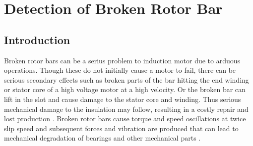 \section{Detection of Broken Rotor Bar}
\subsection{Introduction}
Broken rotor bars can be a serius problem to induction motor due to arduous operations. Though these do not initially cause a motor to fail, there can be serious secondary effects such as broken parts of the bar hitting the end winding or stator core of a high voltage motor at a high velocity. Or the broken bar can lift in the slot and cause damage to the stator core and winding. Thus serious mechanical damage to the insulation may follow, resulting in a costly repair and lost production \cite{noprint}. Broken rotor bars cause torque and speed oscillations at twice slip speed and subsequent forces and vibration are produced that can lead to mechanical degradation of bearings and other mechanical parts \cite{mfstm}.

